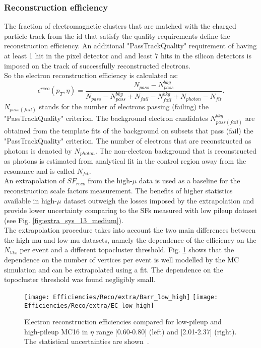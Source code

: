     \subsubsection{Reconstruction efficiency}
    The fraction of electromagnetic clusters that are matched with the charged particle track from the \gls{id} that satisfy the quality requirements define the reconstruction efficiency. An additional "PassTrackQuality" requirement of having at least 1 hit in the pixel detector and and least 7 hits in the silicon detectors is imposed on the track of successfully reconstructed electrons. \\
    So the electron reconstruction efficiency is calculated as:
    \begin{equation}
    \label{eq:eff_reco}
    \epsilon^{reco}(p_T,\eta)=\frac{N_{pass}-N_{pass}^{bkg}}{N_{pass}-N_{pass}^{bkg}+N_{fail}-N_{fail}^{bkg}+N_{photon}-N_{fit}}.
    \end{equation}
    $N_{pass(fail)}$ stands for the number of electrons passing (failing) the "PassTrackQuality" criterion. The background electron candidates $N^{bkg}_{pass(fail)}$ are obtained from the template fits of the background on subsets that pass (fail) the "PassTrackQuality" criterion. The number of electrons that are reconstructed as photons is denoted by $N_{photon}$. The non-electron background that is reconstructed as photons is estimated from analytical fit in the control region away from the \Zee resonance and is called $N_{fit}$.\\
    An extrapolation of $SF_{reco}$ from the high-$\mu$ data is used as a baseline for the reconstruction scale factors measurement. The benefits of higher statistics available in high-$\mu$ dataset outweigh the losses imposed by the extrapolation and provide lower uncertainty comparing to the SFs measured with low pileup dataset (see Fig. \ref{fig:extra_sys_13_medium}). \\
    The extrapolation procedure takes into account the two main differences between the high-mu and low-mu datasets, namely the dependence of the efficiency on the $N_{Vtx}$ per event and a different topocluster threshold. Fig. \ref{fig:reco_high_low} shows that the dependence on the number of vertices per event is well modelled by the MC simulation and can be extrapolated using a fit. The dependence on the topocluster threshold was found negligibly small.
    
\begin{figure}[htbp]
	\centering \texttt{[image: Efficiencies/Reco/extra/Barr\_low\_high]} \texttt{[image: Efficiencies/Reco/extra/EC\_low\_high]} 
	\caption{Electron reconstruction efficiencies compared for low-pileup and high-pileup MC16 in $\eta$ range [0.60-0.80] (left) and [2.01-2.37] (right). The statistical uncertainties are shown~\cite{int_note_electrons}.}  
	\label{fig:reco_high_low}
\end{figure}

